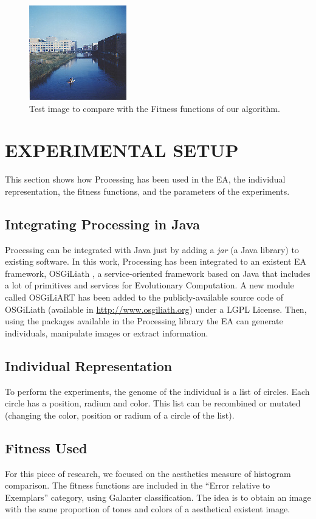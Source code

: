 \documentclass[a4paper,twoside]{article}
\begin{document}
\begin{figure}
\centering
   \includegraphics[scale =3] {images/flevopark.eps}
\caption{Test image to compare with the Fitness functions of our algorithm.}
\label{fig:flevopark}
\end{figure}

\section{EXPERIMENTAL SETUP}
\label{sec:setup}

\noindent This section shows how Processing has been used in the EA, the individual representation, the fitness functions, and the parameters of the experiments.

\subsection{Integrating Processing in Java}
Processing can be integrated with Java just by adding a {\em jar} (a Java library) to existing software. In this work, Processing has been integrated to an existent EA framework, OSGiLiath \cite{OSGILIATH}, a service-oriented framework based on Java that includes a lot of primitives and services for Evolutionary Computation. A new module called OSGiLiART has been added to the publicly-available source code of OSGiLiath (available in \url{http://www.osgiliath.org}) under a LGPL License. Then, using the packages available in the Processing library the EA can generate individuals, manipulate images or extract information.

\subsection{Individual Representation}

To perform the experiments, the genome of the individual is a list of circles. Each circle has a position, radium and color. This list can be recombined or mutated (changing the color, position or radium of a circle of the list).

\subsection{Fitness Used}
For this piece of research, we focused on the aesthetics measure of histogram comparison. The fitness functions are included in the ``Error relative to Exemplars'' category, using Galanter \cite{galanter2012computational} classification. The idea is to obtain an image with the same proportion of tones and colors of a aesthetical existent image.
\end{document}
